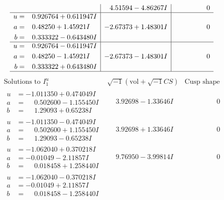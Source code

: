 \documentclass[1p]{elsarticle_modified}
\theoremstyle{definition}
\newcommand{\I}{\sqrt{-1}}
\begin{document}
$$\begin{array}{c|c|c}
 & \phantom{-}4.51594 - 4.86267 I & \phantom{-0.000000 } 0 \\ \hline\begin{aligned}
u &= \phantom{-}0.926764 + 0.611947 I \\
a &= \phantom{-}0.48250 + 1.45921 I \\
b &= \phantom{-}0.333322 - 0.643480 I\end{aligned}
 & -2.67373 + 1.48301 I & \phantom{-0.000000 } 0 \\ \hline\begin{aligned}
u &= \phantom{-}0.926764 - 0.611947 I \\
a &= \phantom{-}0.48250 - 1.45921 I \\
b &= \phantom{-}0.333322 + 0.643480 I\end{aligned}
 & -2.67373 - 1.48301 I & \phantom{-0.000000 } 0\\
 \hline 
 \end{array}$$\newpage$$\begin{array}{c|c|c}  
\text{Solutions to }I^u_{1}& \I (\text{vol} + \sqrt{-1}CS) & \text{Cusp shape}\\
 \hline 
\begin{aligned}
u &= -1.011350 + 0.474049 I \\
a &= \phantom{-}0.502600 - 1.155450 I \\
b &= \phantom{-}1.29093 + 0.65238 I\end{aligned}
 & \phantom{-}3.92698 - 1.33646 I & \phantom{-0.000000 } 0 \\ \hline\begin{aligned}
u &= -1.011350 - 0.474049 I \\
a &= \phantom{-}0.502600 + 1.155450 I \\
b &= \phantom{-}1.29093 - 0.65238 I\end{aligned}
 & \phantom{-}3.92698 + 1.33646 I & \phantom{-0.000000 } 0 \\ \hline\begin{aligned}
u &= -1.062040 + 0.370218 I \\
a &= -0.01049 - 2.11857 I \\
b &= \phantom{-}0.018458 + 1.258440 I\end{aligned}
 & \phantom{-}9.76950 - 3.99814 I & \phantom{-0.000000 } 0 \\ \hline\begin{aligned}
u &= -1.062040 - 0.370218 I \\
a &= -0.01049 + 2.11857 I \\
b &= \phantom{-}0.018458 - 1.258440 I\end{aligned}

\end{array}$$
\end{document}
